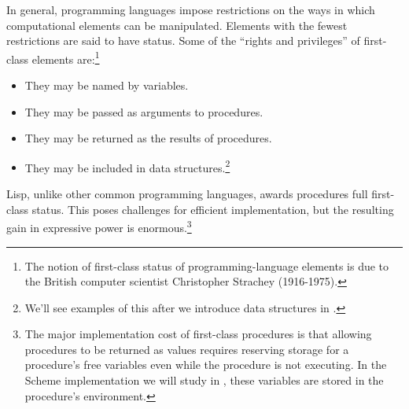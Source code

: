 In general, programming languages impose restrictions on the ways in which
computational elements can be manipulated.  Elements with the fewest
restrictions are said to have  status.  Some of the
``rights and privileges'' of first-class elements are:\footnote{The notion of
first-class status of programming-language elements is due to the British
computer scientist Christopher Strachey (1916-1975).}

\begin{itemize}
\item
They may be named by variables.

\item
They may be passed as arguments to procedures.

\item
They may be returned as the results of procedures.

\item
They may be included in data structures.\footnote{We'll see examples of this
after we introduce data structures in .}
\end{itemize}

\noindent
Lisp, unlike other common programming languages, awards procedures full
first-class status.  This poses challenges for efficient implementation, but
the resulting gain in expressive power is enormous.\footnote{The major
implementation cost of first-class procedures is that allowing procedures to be
returned as values requires reserving storage for a procedure's free variables
even while the procedure is not executing.  In the Scheme implementation we
will study in , these variables are stored in the procedure's
environment.}

